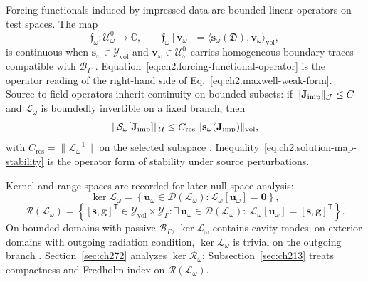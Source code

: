 Forcing functionals induced by impressed data are bounded linear operators on test spaces. The map
\begin{equation}
\label{eq:ch2.forcing-functional-operator}
\mathfrak{f}_\omega:\mathcal{U}_\omega^{0}\longrightarrow\mathbb{C},
\qquad
\mathfrak{f}_\omega[\mathbf{v}_\omega]=
\langle\mathbf{s}_\omega(\mathfrak{D}),\mathbf{v}_\omega\rangle_{\mathrm{vol}},
\end{equation}
is continuous when \(\mathbf{s}_\omega\in\mathcal{Y}_{\mathrm{vol}}\) and \(\mathbf{v}_\omega\in\mathcal{U}_\omega^{0}\) carries homogeneous boundary traces compatible with \(\mathcal{B}_\Gamma\) \cite{stratton1941}. Equation~\eqref{eq:ch2.forcing-functional-operator} is the operator reading of the right-hand side of Eq.~\eqref{eq:ch2.maxwell-weak-form}. Source-to-field operators inherit continuity on bounded subsets: if \(\|\mathbf{J}_{\mathrm{imp}}\|_{\mathcal{J}}\le C\) and \(\mathcal{L}_\omega\) is boundedly invertible on a fixed branch, then
\begin{equation}
\label{eq:ch2.solution-map-stability}
\|\mathcal{S}_\omega[\mathbf{J}_{\mathrm{imp}}]\|_{\mathcal{U}}
\le
C_{\mathrm{res}}\,\|\mathbf{s}_\omega(\mathbf{J}_{\mathrm{imp}})\|_{\mathrm{vol}},
\end{equation}
with \(C_{\mathrm{res}}=\|\mathcal{L}_\omega^{-1}\|\) on the selected subspace \cite{harrington2001}. Inequality~\eqref{eq:ch2.solution-map-stability} is the operator form of stability under source perturbations.

Kernel and range spaces are recorded for later null-space analysis:
\begin{equation}
\label{eq:ch2.kernel-range-L}
\ker\mathcal{L}_\omega
=
\left\{
\mathbf{u}_\omega\in\mathcal{D}(\mathcal{L}_\omega):
\mathcal{L}_\omega[\mathbf{u}_\omega]=\mathbf{0}
\right\},
\end{equation}
\begin{equation}
\label{eq:ch2.range-L}
\mathcal{R}(\mathcal{L}_\omega)
=
\left\{
[\mathbf{s},\mathbf{g}]^{\mathsf{T}}\in
\mathcal{Y}_{\mathrm{vol}}\times\mathcal{Y}_\Gamma:
\exists\,\mathbf{u}_\omega\in\mathcal{D}(\mathcal{L}_\omega):\
\mathcal{L}_\omega[\mathbf{u}_\omega]=[\mathbf{s},\mathbf{g}]^{\mathsf{T}}
\right\}.
\end{equation}
On bounded domains with passive \(\mathcal{B}_\Gamma\), \(\ker\mathcal{L}_\omega\) contains cavity modes; on exterior domains with outgoing radiation condition, \(\ker\mathcal{L}_\omega\) is trivial on the outgoing branch \cite{stratton1941}. Section~\ref{sec:ch272} analyzes \(\ker\mathcal{R}_\omega\); Subsection~\ref{sec:ch213} treats compactness and Fredholm index on \(\mathcal{R}(\mathcal{L}_\omega)\).


